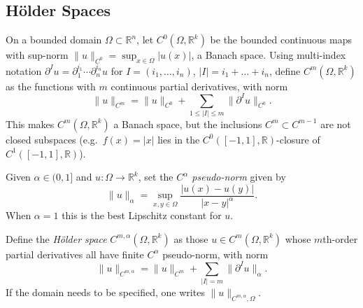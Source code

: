 \subsection{Hölder Spaces}

\begin{definition}
  \label{def:pet-ch11-cm-norm}

  On a bounded domain $\Omega\subset\mathbb{R}^n$, let
  $C^0(\Omega,\mathbb{R}^k)$ be the bounded continuous maps with sup-norm
  $\|u\|_{C^0}=\sup_{x\in\Omega}|u(x)|$, a Banach space. Using multi-index
  notation $\partial^Iu=\partial_1^{i_1}\cdots\partial_n^{i_n}u$ for
  $I=(i_1,\dots,i_n)$, $|I|=i_1+\dots+i_n$, define $C^m(\Omega,\mathbb{R}^k)$ as
  the functions with $m$ continuous partial derivatives, with norm
  \[
    \|u\|_{C^m}=\|u\|_{C^0}+\sum_{1\le|I|\le m}\|\partial^Iu\|_{C^0}.
  \]
  This makes $C^m(\Omega,\mathbb{R}^k)$ a Banach space, but the inclusions
  $C^m\subset C^{m-1}$ are not closed subspaces (e.g.\ $f(x)=|x|$ lies in the
  $C^0([-1,1],\mathbb{R})$-closure of $C^1([-1,1],\mathbb{R})$).
\end{definition}

\begin{definition}
  \label{def:pet-ch11-holder-pseudonorm}

  Given $\alpha\in(0,1]$ and $u:\Omega\to\mathbb{R}^k$, set the
  \emph{$C^\alpha$ pseudo-norm}
  given by
  \[
    \|u\|_\alpha=\sup_{x,y\in\Omega}\frac{|u(x)-u(y)|}{|x-y|^\alpha}.
  \]
  When $\alpha=1$ this is the best Lipschitz constant for $u$.
\end{definition}

\begin{definition}
  \label{def:pet-ch11-holder-space}

  Define the \emph{Hölder space} $C^{m,\alpha}(\Omega,\mathbb{R}^k)$ as those
  $u\in C^m(\Omega,\mathbb{R}^k)$ whose $m$th-order partial derivatives all have
  finite $C^\alpha$ pseudo-norm, with norm
  \[
    \|u\|_{C^{m,\alpha}}=\|u\|_{C^m}+\sum_{|I|=m}\|\partial^Iu\|_\alpha.
  \]
  If the domain needs to be specified, one writes $\|u\|_{C^{m,\alpha},\Omega}$.
\end{definition}

